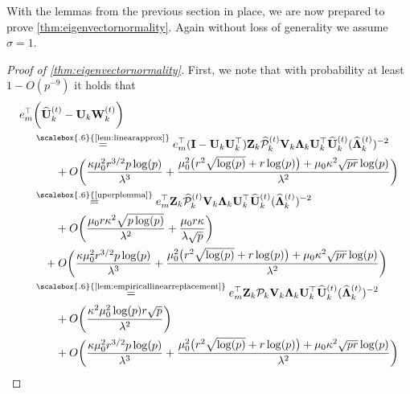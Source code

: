 \documentclass[10pt]{article}
\newcommand{\0}{{\mathbf{0}}}
\newcommand{\1}{{\mathbf{1}}}
\newcommand{\U}{{\mathbf{U}}}
\renewcommand{\t}{^{\top}}
\newcommand{\uhat}{\mathbf{\hat{U}}}
\newcommand{\inv}{^{-1}}
\renewcommand{\hat}{\widehat}
\renewcommand{\hat}{\widehat}
\begin{document}
With the lemmas from the previous section in place, we are now prepared to prove \cref{thm:eigenvectornormality}.  Again without loss of generality we assume $\sigma = 1$.  
\begin{proof}[Proof of \cref{thm:eigenvectornormality}]
First, we note that with probability at least $1 - O(p^{-9})$ it holds that
\begin{align*}
    e_m\t &\bigg( \uhat_k^{(t)} - \U_k \mathbf{W}_k^{(t)} \bigg) \\
    &\overset{\scalebox{.6}{\text{\cref{lem:linearapprox}}}}{=} e_m\t (\mathbf{I} - \U_k \U_k\t ) \mathbf{Z}_k \mathcal{\hat P}_k^{(t)} \mathbf{V}_k \mathbf{\Lambda}_k \U_k\t \uhat_k^{(t)} (\mathbf{\hat{\Lambda}}_k^{(t)})^{-2}  \\
    &\qquad + O\bigg( \frac{\kappa \mu_0^2 r^{3/2}p \log(p)}{\lambda^3} + \frac{\mu_0^2 \big( r^2 \sqrt{\log(p)} + r \log(p)\big) + \mu_0 \kappa^2 \sqrt{pr} \log(p)}{\lambda^2} \bigg) \\
    &\overset{\scalebox{.6}{\text{\cref{uperplemma}}}}{=} e_m\t  \mathbf{Z}_k \mathcal{\hat P}_k^{(t)} \mathbf{V}_k \mathbf{\Lambda}_k \U_k\t \uhat_k^{(t)} (\mathbf{\hat{\Lambda}}_k^{(t)})^{-2}  \\
    &\qquad + O\bigg( \frac{\mu_0 r \kappa^2 \sqrt{p\log(p)}}{\lambda^2} + \frac{\mu_0 r \kappa}{\lambda \sqrt{p}} \bigg) \\
    &\quad + O\bigg( \frac{\kappa \mu_0^2 r^{3/2}p \log(p)}{\lambda^3} + \frac{\mu_0^2 \big( r^2 \sqrt{\log(p)} + r \log(p)\big) + \mu_0 \kappa^2 \sqrt{pr} \log(p)}{\lambda^2} \bigg) \\
    &\overset{\scalebox{.6}{\text{\cref{lem:empiricallinearreplacement}}}}{=} e_m\t \mathbf{Z}_k \mathcal{ P}_k \mathbf{V}_k \mathbf{\Lambda}_k \U_k\t \uhat_k^{(t)}  (\mathbf{\hat{\Lambda}}_k^{(t)})^{-2} \\
    &\qquad + O\bigg( \frac{\kappa^2 \mu_0^2 \log(p) r \sqrt{p}}{\lambda^2} \bigg) \\
    &\qquad + O\bigg( \frac{\kappa \mu_0^2 r^{3/2}p \log(p)}{\lambda^3} + \frac{\mu_0^2 \big( r^2 \sqrt{\log(p)} + r \log(p)\big) + \mu_0 \kappa^2 \sqrt{pr} \log(p)}{\lambda^2} \bigg) \\

\end{align*}
\end{proof}
\end{document}
